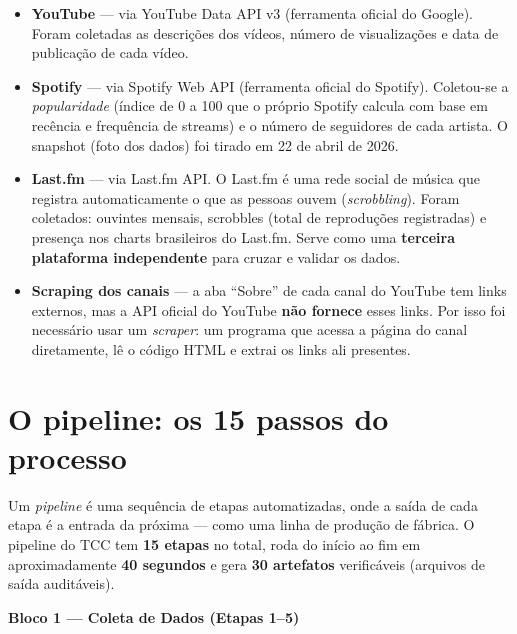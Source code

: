 \documentclass[12pt,a4paper]{article}
\newcommand{\num}[1]{\textcolor{azul}{\textbf{#1}}}
\newcommand{\term}[1]{\textcolor{roxo}{\textit{#1}}}
\begin{document}
\begin{itemize}
  \item \textbf{YouTube} --- via YouTube Data API v3 (ferramenta oficial do
        Google). Foram coletadas as descrições dos vídeos, número de
        visualizações e data de publicação de cada vídeo.
  \item \textbf{Spotify} --- via Spotify Web API (ferramenta oficial do
        Spotify). Coletou-se a \term{popularidade} (índice de 0 a 100 que o
        próprio Spotify calcula com base em recência e frequência de streams) e
        o número de seguidores de cada artista. O snapshot (foto dos dados) foi
        tirado em 22 de abril de 2026.
  \item \textbf{Last.fm} --- via Last.fm API. O Last.fm é uma rede social de
        música que registra automaticamente o que as pessoas ouvem
        (\term{scrobbling}). Foram coletados: ouvintes mensais, scrobbles (total
        de reproduções registradas) e presença nos charts brasileiros do Last.fm.
        Serve como uma \textbf{terceira plataforma independente} para cruzar e
        validar os dados.
  \item \textbf{Scraping dos canais} --- a aba ``Sobre'' de cada canal do
        YouTube tem links externos, mas a API oficial do YouTube \textbf{não
        fornece} esses links. Por isso foi necessário usar um \term{scraper}: um
        programa que acessa a página do canal diretamente, lê o código HTML e
        extrai os links ali presentes.
\end{itemize}

\section{O pipeline: os 15 passos do processo}

Um \term{pipeline} é uma sequência de etapas automatizadas, onde a saída de
cada etapa é a entrada da próxima --- como uma linha de produção de fábrica.
O pipeline do TCC tem \num{15 etapas} no total, roda do início ao fim em
aproximadamente \num{40 segundos} e gera \num{30 artefatos} verificáveis
(arquivos de saída auditáveis).

\bigskip
\noindent\textbf{\textcolor{azul}{Bloco 1 — Coleta de Dados (Etapas 1--5)}}
\end{document}

